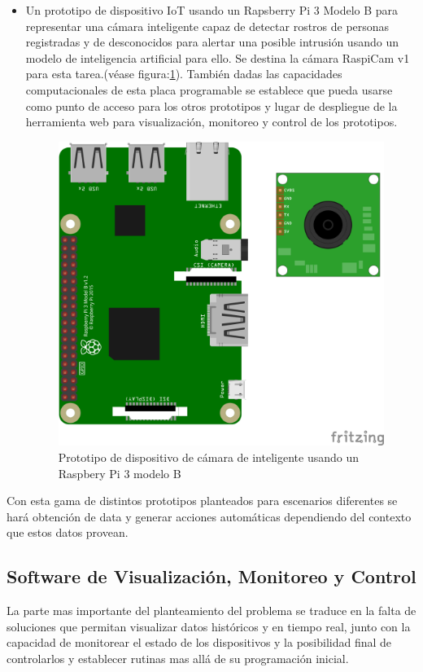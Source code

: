 \begin{itemize}
\item Un prototipo de dispositivo IoT usando un Rapsberry Pi 3 Modelo B para representar una cámara inteligente capaz de detectar rostros de personas registradas y de desconocidos para alertar una posible intrusión usando un modelo de inteligencia artificial para ello. Se destina la cámara RaspiCam v1 para esta tarea.(véase figura:\ref{fig:rpipeter}). También dadas las capacidades computacionales de esta placa programable se establece que pueda usarse como punto de acceso para los otros prototipos y lugar de despliegue de la herramienta web para visualización, monitoreo y control de los prototipos. 
\begin{figure}[htb]
\centering
\includegraphics[scale=0.5]{./Figuras/rpipeter.png}
\caption{Prototipo de dispositivo de cámara de inteligente usando un Raspbery Pi 3 modelo B}
\label{fig:rpipeter}
\vspace*{-10pt}
\end{figure}

\end{itemize}

Con esta gama de distintos prototipos planteados para escenarios diferentes se hará obtención de data y generar acciones automáticas dependiendo del contexto que estos datos provean.  

\subsection{Software de Visualización, Monitoreo y Control}
La parte mas importante del planteamiento del problema se traduce en la falta de soluciones que permitan visualizar datos históricos y en tiempo real, junto con la capacidad de monitorear el estado de los dispositivos y la posibilidad final de controlarlos y establecer rutinas mas allá de su programación inicial.\\

